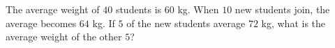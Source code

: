 The average weight of $40$ students is $60$ kg. When $10$ new students join, the average becomes $64$ kg. If $5$ of the new students average $72$ kg, what is the average weight of the other $5$?
